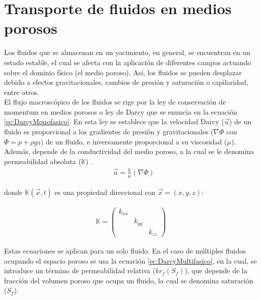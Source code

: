 \section{Transporte de fluidos en medios porosos}\label{sec:Darcy}

Los fluidos que se almacenan en un yacimiento, en general, se encuentran en un estado estable, el cual se afecta con la aplicación de diferentes campos actuando sobre el dominio físico (el medio poroso). Así, los fluidos se pueden desplazar debido a efectos gravitacionales, cambios de presión y saturación o capilaridad, entre otros.\\ %

El flujo macroscópico de los fluidos se rige por la ley de conservación de momentum en medios porosos o ley de Darcy que se enuncia en la ecuación \ref{ec:DarcyMonofasico}. En esta ley se establece que la velocidad Darcy ($\vec{u}$) de un fluido es proporcional a los gradientes de presión y gravitacionales ($\nabla{\Phi}$ con $\Phi = p + \rho g z$) de un fluido, e inversamente proporcional a su viscosidad ($\mu$). Además, depende de la conductividad del medio poroso, a la cual se le denomina permeabilidad absoluta ($\mathbb{K}$) \citep{Whitaker1986, FANCHI2002108}.
\begin{align}
	\label{ec:DarcyMonofasico} & \vec{u}=\frac{\mathbb{K}}{\mu } \left(\nabla{\Phi}\right)	
\end{align}


donde $\mathbb{K}(\vec{x},t)$ es una propiedad direccional con $\vec{x}=(x,y,z)$:
 
\begin{align}
	\mathbb{K} = \left(\begin{array}{ccc}k_{xx}& & \\
	& k_{yy} & \\
	& & k_{zz}
	\end{array}\right)
\end{align}

Estas ecuaciones se aplican para un solo fluido. En el caso de múltiples fluidos ocupando el espacio poroso se usa la ecuación \ref{ec:DarcyMultifasico}, en la cual, se introduce un término de permeabilidad relativa ($kr_{f}(S_{f})$), que depende de la fracción del volumen poroso que ocupa un fluido, la cual se denomina saturación ($S_{f}$).


